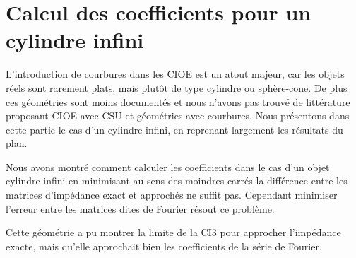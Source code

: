 \chapter{Calcul des coefficients pour un cylindre infini}
\label{sec:cylindre}
\minitoc
\newpage
{}
L'introduction de courbures dans les CIOE est un atout majeur, car les objets réels sont rarement plats, mais plutôt de type cylindre ou sphère-cone. De plus ces géométries sont moins documentés et nous n'avons pas trouvé de littérature proposant CIOE avec CSU et géométries avec courbures. Nous présentons dans cette partie le cas d'un cylindre infini, en reprenant largement les résultats du plan.







Nous avons montré comment calculer les coefficients dans le cas d'un objet cylindre infini en minimisant au sens des moindres carrés la différence entre les matrices d'impédance exact et approchés ne suffit pas. Cependant minimiser l'erreur entre les matrices dites de Fourier
résout ce problème.

Cette géométrie a pu montrer la limite de la CI3 pour approcher l'impédance exacte, mais qu'elle approchait bien les coefficients de la série de Fourier.

